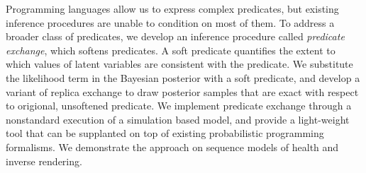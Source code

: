 Programming languages allow us to express complex predicates, but existing inference procedures are unable to condition on most of them.
To address a broader class of predicates, we develop an inference procedure called \emph{predicate exchange}, which softens predicates.
A soft predicate quantifies the extent to which values of latent variables
are consistent with the predicate.
We substitute the likelihood term in the Bayesian posterior with a soft predicate, and develop a variant of replica exchange to draw posterior samples that are exact with respect to origional, unsoftened predicate.
We implement predicate exchange through a nonstandard execution of a simulation based model, and provide a light-weight tool that can be supplanted on top of existing probabilistic programming formalisms. 
We demonstrate the approach on sequence models of health and inverse rendering. 



% 